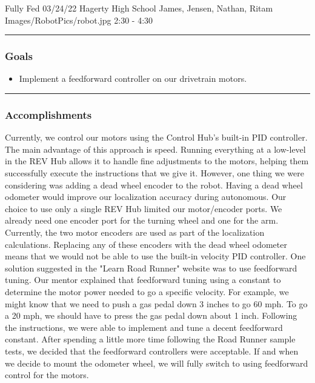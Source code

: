 \insertmeeting 
	{Fully Fed} 
	{03/24/22} 
	{Hagerty High School}
	{James, Jensen, Nathan, Ritam}
	{Images/RobotPics/robot.jpg}
	{2:30 - 4:30}
	
\noindent\hfil\rule{\textwidth}{.4pt}\hfil
\subsubsection*{Goals}
\begin{itemize}
    \item Implement a feedforward controller on our drivetrain motors. 

\end{itemize} 

\noindent\hfil\rule{\textwidth}{.4pt}\hfil

\subsubsection*{Accomplishments}
Currently, we control our motors using the Control Hub's built-in PID controller. The main advantage of this approach is speed. Running everything at a low-level in the REV Hub allows it to handle fine adjustments to the motors, helping them successfully execute the instructions that we give it. However, one thing we were considering was adding a dead wheel encoder to the robot. Having a dead wheel odometer would improve our localization accuracy during autonomous. Our choice to use only a single REV Hub limited our motor/encoder ports. We already need one encoder port for the turning wheel and one for the arm. Currently, the two motor encoders are used as part of the localization calculations. Replacing any of these encoders with the dead wheel odometer means that we would not be able to use the built-in velocity PID controller. One solution suggested in the "Learn Road Runner" website was to use feedforward tuning. Our mentor explained that feedforward tuning using a constant to determine the motor power needed to go a specific velocity. For example, we might know that we need to push a gas pedal down 3 inches to go 60 mph. To go a 20 mph, we should have to press the gas pedal down about 1 inch. Following the instructions, we were able to implement and tune a decent feedforward constant. After spending a little more time following the Road Runner sample tests, we decided that the feedforward controllers were acceptable. If and when we decide to mount the odometer wheel, we will fully switch to using feedforward control for the motors. 


